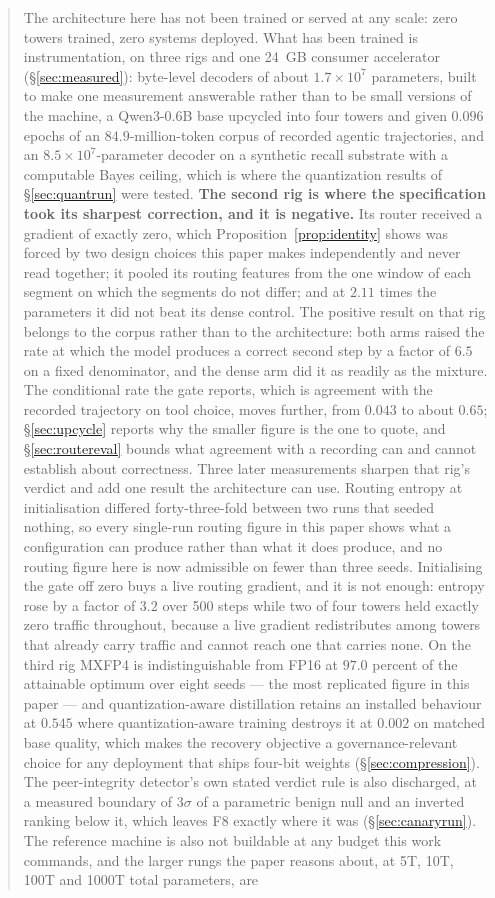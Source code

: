 \documentclass[11pt]{article}
\begin{document}
\begin{abstract}
The architecture here has not been trained or served at any scale: zero towers trained, zero systems deployed. What has been trained is instrumentation, on three rigs and one 24~GB consumer accelerator (\S\ref{sec:measured}): byte-level decoders of about $1.7\times10^{7}$ parameters, built to make one measurement answerable rather than to be small versions of the machine, a Qwen3-0.6B base upcycled into four towers and given $0.096$ epochs of an $84.9$-million-token corpus of recorded agentic trajectories, and an $8.5\times10^{7}$-parameter decoder on a synthetic recall substrate with a computable Bayes ceiling, which is where the quantization results of \S\ref{sec:quantrun} were tested. \textbf{The second rig is where the specification took its sharpest correction, and it is negative.} Its router received a gradient of exactly zero, which Proposition~\ref{prop:identity} shows was forced by two design choices this paper makes independently and never read together; it pooled its routing features from the one window of each segment on which the segments do not differ; and at $2.11$ times the parameters it did not beat its dense control. The positive result on that rig belongs to the corpus rather than to the architecture: both arms raised the rate at which the model produces a correct second step by a factor of $6.5$ on a fixed denominator, and the dense arm did it as readily as the mixture. The conditional rate the gate reports, which is agreement with the recorded trajectory on tool choice, moves further, from $0.043$ to about $0.65$; \S\ref{sec:upcycle} reports why the smaller figure is the one to quote, and \S\ref{sec:routereval} bounds what agreement with a recording can and cannot establish about correctness. Three later measurements sharpen that rig's verdict and add one result the architecture can use. Routing entropy at initialisation differed forty-three-fold between two runs that seeded nothing, so every single-run routing figure in this paper shows what a configuration can produce rather than what it does produce, and no routing figure here is now admissible on fewer than three seeds. Initialising the gate off zero buys a live routing gradient, and it is not enough: entropy rose by a factor of $3.2$ over 500 steps while two of four towers held exactly zero traffic throughout, because a live gradient redistributes among towers that already carry traffic and cannot reach one that carries none. On the third rig MXFP4 is indistinguishable from FP16 at $97.0$ percent of the attainable optimum over eight seeds --- the most replicated figure in this paper --- and quantization-aware distillation retains an installed behaviour at $0.545$ where quantization-aware training destroys it at $0.002$ on matched base quality, which makes the recovery objective a governance-relevant choice for any deployment that ships four-bit weights (\S\ref{sec:compression}). The peer-integrity detector's own stated verdict rule is also discharged, at a measured boundary of $3\sigma$ of a parametric benign null and an inverted ranking below it, which leaves F8 exactly where it was (\S\ref{sec:canaryrun}). The reference machine is also not buildable at any budget this work commands, and the larger rungs the paper reasons about, at 5T, 10T, 100T and 1000T total parameters, are 
\end{abstract}
\end{document}
